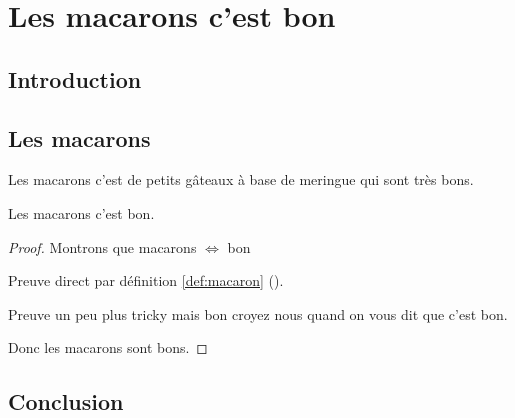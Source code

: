 
\chapter{Les macarons c'est bon}



\section{Introduction}

\section{Les macarons}
\begin{definition}[Macaron]
  Les macarons c'est de petits gâteaux à base de meringue qui sont très bons.
  \label{def:macaron}
\end{definition}

\begin{proposition}
  Les macarons c'est bon.
\end{proposition}

\begin{proof}
  Montrons que macarons $\Leftrightarrow$ bon
  
  \begin{myproof}
    Preuve direct par définition \ref{def:macaron} ().
  \end{myproof}
  \begin{myproof}
    Preuve un peu plus tricky mais bon croyez nous quand on vous dit que c'est bon.
  \end{myproof}
  Donc les macarons sont bons.
\end{proof}

\section{Conclusion}
